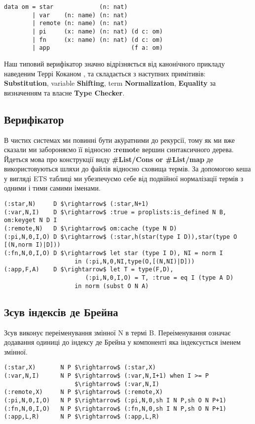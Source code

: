 \documentclass{article}
\begin{document}
\begin{lstlisting}[mathescape=true]
data om = star             (n: nat)
        | var    (n: name) (n: nat)
        | remote (n: name) (n: nat)
        | pi     (x: name) (n: nat) (d c: om)
        | fn     (x: name) (n: nat) (d c: om)
        | app                       (f a: om)
\end{lstlisting}

Наш типовий верифікатор значно відрізняється від канонічного прикладу наведеним Террі Коканом \cite{Coq96},
та складається з наступних примітивів: {\bf Substitution}, variable {\bf Shifting}, term {\bf Normalization},
{\bf Equality} за визначенням та власне {\bf Type Checker}.

\subsection{Верифікатор}
В чистих системах ми повинні бути акуратними до рекурсії, тому як ми вже сказали ми забороняємо її
відносно {\bf :remote} вершин синтаксичного дерева. Йдеться мова про конструкції виду
{\bf \#List/Cons or \#List/map} де використовуються шляхи до файлів відносно сховища термів.
За допомогою кеша у вигляді ETS таблиці ми убезпечуємо себе від подвійної нормалізації термів з одними і тими самими іменами.

\begin{lstlisting}[mathescape=true]
(:star,N)     D $\rightarrow$ (:star,N+1)
(:var,N,I)    D $\rightarrow$ :true = proplists:is_defined N B, om:keyget N D I
(:remote,N)   D $\rightarrow$ om:cache (type N D)
(:pi,N,0,I,O) D $\rightarrow$ (:star,h(star(type I D)),star(type O [(N,norm I)|D]))
(:fn,N,0,I,O) D $\rightarrow$ let star (type I D), NI = norm I
                    in (:pi,N,0,NI,type(O,[(N,NI)|D]))
(:app,F,A)    D $\rightarrow$ let T = type(F,D),
                       (:pi,N,0,I,O) = T, :true = eq I (type A D)
                    in norm (subst O N A)
\end{lstlisting}

\subsection{Зсув індексів де Брейна}
Зсув виконує переіменування змінної N в термі B. Переіменування означає додавання одиниці до індексу де Брейна у компоненті яка індексується іменем змінної.

\begin{lstlisting}[mathescape=true]
(:star,X)       N P $\rightarrow$ (:star,X)
(:var,N,I)      N P $\rightarrow$ (:var,N,I+1) when I >= P
                    $\rightarrow$ (:var,N,I)
(:remote,X)     N P $\rightarrow$ (:remote,X)
(:pi,N,0,I,O)   N P $\rightarrow$ (:pi,N,0,sh I N P,sh O N P+1)
(:fn,N,0,I,O)   N P $\rightarrow$ (:fn,N,0,sh I N P,sh O N P+1)
(:app,L,R)      N P $\rightarrow$ (:app,L,R)
\end{lstlisting}
\end{document}

